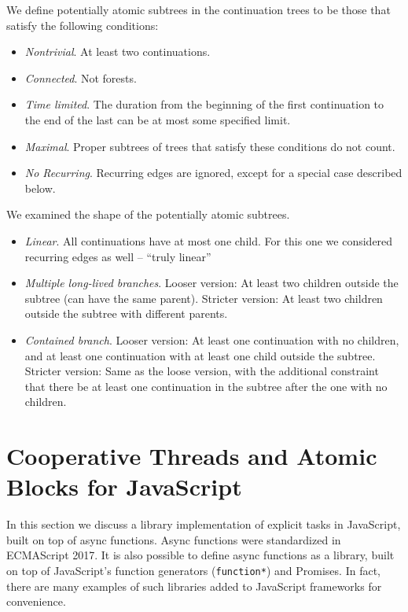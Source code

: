 \documentclass[acmsmall,anonymous,review]{acmart}\settopmatter{printfolios=true,printccs=false,printacmref=false}
\begin{document}
We define potentially atomic subtrees in the continuation trees to be those that satisfy the following conditions:

\begin{itemize}
\item \emph{Nontrivial}. At least two continuations.
\item \emph{Connected}. Not forests.
\item \emph{Time limited}. The duration from the beginning of the first continuation to the end of the last can be at most some specified limit.
\item \emph{Maximal}. Proper subtrees of trees that satisfy these conditions do not count.
\item \emph{No Recurring}. Recurring edges are ignored, except for a special case described below.
\end{itemize}

We examined the shape of the potentially atomic subtrees.

\begin{itemize}
\item \emph{Linear}. All continuations have at most one child.
  For this one we considered recurring edges as well -- ``truly linear''
\item \emph{Multiple long-lived branches}. Looser version: At least two children outside the subtree (can have the same parent).
Stricter version: At least two children outside the subtree with different parents.
\item \emph{Contained branch}. Looser version: At least one continuation with no children, and at least one continuation with at least one child outside the subtree.
  Stricter version: Same as the loose version, with the additional constraint that there be at least one continuation in the subtree after the one with no children.
\end{itemize}

\section{Cooperative Threads and Atomic Blocks for JavaScript}

\cite{Ringenburg2005}
\cite{Vilk2014} %

In this section we discuss a library implementation of explicit tasks in JavaScript, built on top of async functions.
Async functions were standardized in ECMAScript 2017.
It is also possible to define async functions as a library, built on top of JavaScript's function generators (\texttt{function*}) and Promises.
In fact, there are many examples of such libraries added to JavaScript frameworks for convenience.
\end{document}
